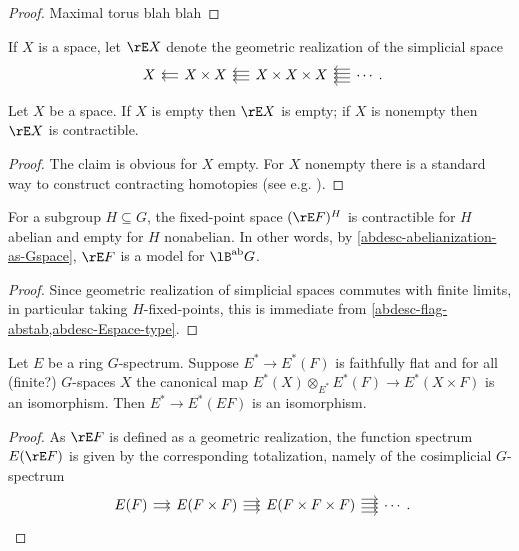 \begin{proof}
  Maximal torus blah blah
\end{proof}

\begin{notation}
  \label{abdesc-Espace}
  If $X$ is a space, let $\rE X$ denote the geometric realization of
  the simplicial space
  \[
  \simpl{X}{X \times X}{X \times X \times X}.
  \]
\end{notation}

\begin{lemma}
  \label{abdesc-Espace-type}
  Let $X$ be a space. If $X$ is empty then $\rE X$ is empty; if $X$ is
  nonempty then $\rE X$ is contractible.
\end{lemma}

\begin{proof}
  The claim is obvious for $X$ empty. For $X$ nonempty there is a
  standard way to construct contracting homotopies (see
  e.g. \cite[3.14]{dugger-primer}).
\end{proof}

\begin{lemma}
  \label{abdesc-BabG-construction}
  For a subgroup $H \subseteq G$, the fixed-point space $(\rE F)^H$ is
  contractible for $H$ abelian and empty for $H$ nonabelian. In other
  words, by \cref{abdesc-abelianization-as-Gspace}, $\rE F$ is a model
  for $\lB^\ab G$.
\end{lemma}

\begin{proof}
  Since geometric realization of simplicial spaces commutes with
  finite limits, in particular taking $H$-fixed-points, this is
  immediate from \cref{abdesc-flag-abstab,abdesc-Espace-type}.
\end{proof}

\begin{lemma}
  \label{abdesc-flag-faithflat}
  Let $E$ be a ring $G$-spectrum. Suppose $E^* \to E^*(F)$ is
  faithfully flat and for all (finite?) $G$-spaces $X$ the canonical
  map $E^*(X) \otimes_{E^*} E^*(F) \to E^*(X \times F)$ is an
  isomorphism. Then $E^* \to E^*(EF)$ is an isomorphism.
\end{lemma}

\begin{proof}
  As $\rE F$ is defined as a geometric realization, the function
  spectrum $E(\rE F)$ is given by the corresponding totalization,
  namely of the cosimplicial $G$-spectrum
  \[
  \cosimpl{E(F)}{E(F \times F)}{E(F \times F \times F)}.
  \]
\end{proof}

